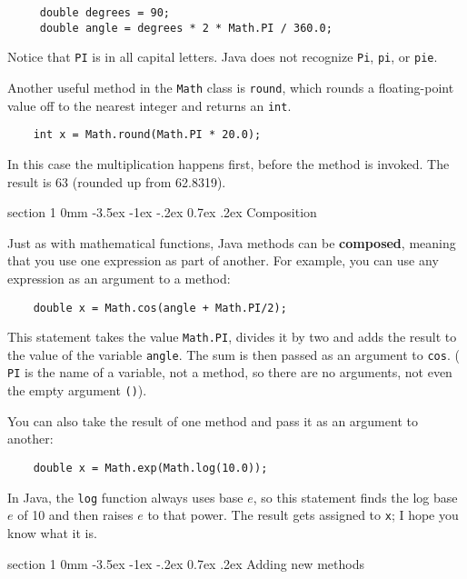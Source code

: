 \documentclass{book}
\makeatletter
\renewcommand{\section}{\@startsection 
    {section} {1} {0mm}%
    {-3.5ex \@plus -1ex \@minus -.2ex}%
    {0.7ex \@plus.2ex}%
    {\normalfont\Large\bfseries}}
\makeatother
\begin{document}
\begin{verbatim}
     double degrees = 90;
     double angle = degrees * 2 * Math.PI / 360.0;
\end{verbatim}
%
Notice that {\tt PI} is in all capital letters.  Java does
not recognize {\tt Pi}, {\tt pi}, or {\tt pie}.

Another useful method in the {\tt Math} class is {\tt round},
which rounds a floating-point value off to the nearest integer
and returns an {\tt int}.

\begin{verbatim}
    int x = Math.round(Math.PI * 20.0);
\end{verbatim}
%
In this case the multiplication happens first, before the
method is invoked.  The result is 63 (rounded up from 62.8319).


\section {Composition}
\label{composition}

Just as with mathematical functions, Java methods can be {\bf
composed}, meaning that you use one expression as part of another.
For example, you can use any expression as an argument to a method:

\begin{verbatim}
    double x = Math.cos(angle + Math.PI/2);
\end{verbatim}
%
This statement takes the value {\tt Math.PI}, divides it by two and
adds the result to the value of the variable {\tt angle}.  The sum is
then passed as an argument to {\tt cos}. ({\tt
PI} is the name of a variable, not a method, so there are no
arguments, not even the empty argument {\tt()}).

You can also take the result of one method and pass it as
an argument to another:

\begin{verbatim}
    double x = Math.exp(Math.log(10.0));
\end{verbatim}
%
In Java, the {\tt log} function always uses base $e$, so this
statement finds the log base $e$ of 10 and then raises $e$ to that
power.  The result gets assigned to {\tt x}; I hope you know what it
is.

\section{Adding new methods}
\end{document}
